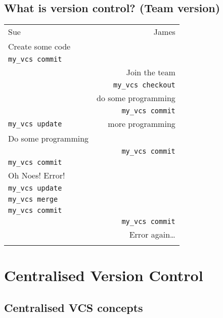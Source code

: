 \documentclass[]{scrartcl}
\begin{document}
\subsection{What is version control? (Team
version)}\label{what-is-version-control-team-version}

\begin{longtable}[c]{@{}lr@{}}
\hline\noalign{\medskip}
Sue & James
\\\noalign{\medskip}
\hline\noalign{\medskip}
Create some code &
\\\noalign{\medskip}
\texttt{my\_vcs commit} &
\\\noalign{\medskip}
& Join the team
\\\noalign{\medskip}
& \texttt{my\_vcs checkout}
\\\noalign{\medskip}
& do some programming
\\\noalign{\medskip}
& \texttt{my\_vcs commit}
\\\noalign{\medskip}
\texttt{my\_vcs update} & more programming
\\\noalign{\medskip}
Do some programming &
\\\noalign{\medskip}
& \texttt{my\_vcs commit}
\\\noalign{\medskip}
\texttt{my\_vcs commit} &
\\\noalign{\medskip}
Oh Noes! Error! &
\\\noalign{\medskip}
\texttt{my\_vcs update} &
\\\noalign{\medskip}
\texttt{my\_vcs merge} &
\\\noalign{\medskip}
\texttt{my\_vcs commit} &
\\\noalign{\medskip}
& \texttt{my\_vcs commit}
\\\noalign{\medskip}
& Error again\ldots{}
\\\noalign{\medskip}
\hline
\end{longtable}

\section{Centralised Version Control}\label{centralised-version-control}

\subsection{Centralised VCS concepts}\label{centralised-vcs-concepts}
\end{document}
